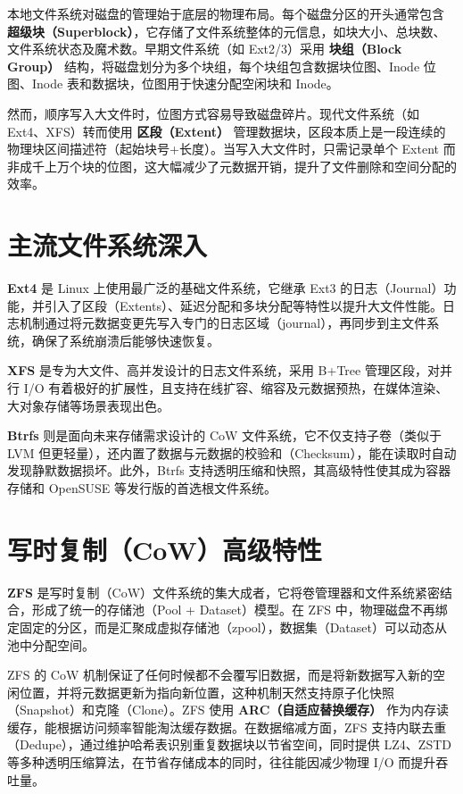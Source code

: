 \documentclass[12pt,UTF8]{ctexbook}
\begin{document}
	本地文件系统对磁盘的管理始于底层的物理布局。每个磁盘分区的开头通常包含 \textbf{超级块（Superblock）}，它存储了文件系统整体的元信息，如块大小、总块数、文件系统状态及魔术数。早期文件系统（如 Ext2/3）采用 \textbf{块组（Block Group）} 结构，将磁盘划分为多个块组，每个块组包含数据块位图、Inode 位图、Inode 表和数据块，位图用于快速分配空闲块和 Inode。
	
	然而，顺序写入大文件时，位图方式容易导致磁盘碎片。现代文件系统（如 Ext4、XFS）转而使用 \textbf{区段（Extent）} 管理数据块，区段本质上是一段连续的物理块区间描述符（起始块号+长度）。当写入大文件时，只需记录单个 Extent 而非成千上万个块的位图，这大幅减少了元数据开销，提升了文件删除和空间分配的效率。
	
	\section{主流文件系统深入}
	
	\textbf{Ext4} 是 Linux 上使用最广泛的基础文件系统，它继承 Ext3 的日志（Journal）功能，并引入了区段（Extents）、延迟分配和多块分配等特性以提升大文件性能。日志机制通过将元数据变更先写入专门的日志区域（journal），再同步到主文件系统，确保了系统崩溃后能够快速恢复。
	
	\textbf{XFS} 是专为大文件、高并发设计的日志文件系统，采用 B+Tree 管理区段，对并行 I/O 有着极好的扩展性，且支持在线扩容、缩容及元数据预热，在媒体渲染、大对象存储等场景表现出色。
	
	\textbf{Btrfs} 则是面向未来存储需求设计的 CoW 文件系统，它不仅支持子卷（类似于 LVM 但更轻量），还内置了数据与元数据的校验和（Checksum），能在读取时自动发现静默数据损坏。此外，Btrfs 支持透明压缩和快照，其高级特性使其成为容器存储和 OpenSUSE 等发行版的首选根文件系统。
	
	\section{写时复制（CoW）高级特性}
	
	\textbf{ZFS} 是写时复制（CoW）文件系统的集大成者，它将卷管理器和文件系统紧密结合，形成了统一的存储池（Pool + Dataset）模型。在 ZFS 中，物理磁盘不再绑定固定的分区，而是汇聚成虚拟存储池（zpool），数据集（Dataset）可以动态从池中分配空间。
	
	ZFS 的 CoW 机制保证了任何时候都不会覆写旧数据，而是将新数据写入新的空闲位置，并将元数据更新为指向新位置，这种机制天然支持原子化快照（Snapshot）和克隆（Clone）。ZFS 使用 \textbf{ARC（自适应替换缓存）} 作为内存读缓存，能根据访问频率智能淘汰缓存数据。在数据缩减方面，ZFS 支持内联去重（Dedupe），通过维护哈希表识别重复数据块以节省空间，同时提供 LZ4、ZSTD 等多种透明压缩算法，在节省存储成本的同时，往往能因减少物理 I/O 而提升吞吐量。
	
\end{document}
